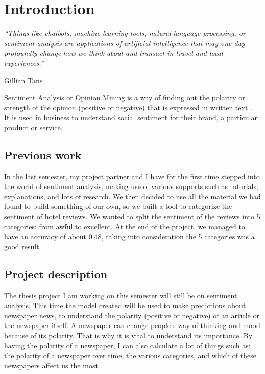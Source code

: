\section[Introduction]{Introduction}
\label{chap:introduction}
\epigraph{\centering \textit{“Things like chatbots, machine learning tools, natural language processing, or sentiment analysis are applications of artificial intelligence that may one day profoundly change how we think about and transact in travel and local experiences.”}}{Gillian Tans}

Sentiment Analysis or Opinion Mining is a way of finding out the polarity or strength of the opinion (positive or negative) that is expressed in written text \cite{samuels_news_2020}.\\
It is used in business to understand social sentiment for their brand, a particular product or service.

\subsection[Previous work]{Previous work}
\label{chap:previouswork}
In the last semester, my project partner and I have for the first time stepped into the world of sentiment analysis, making use of various supports such as tutorials, explanations, and lots of research.
We then decided to use all the material we had found to build something of our own, so we built a tool to categorize the sentiment of hotel reviews.
We wanted to split the sentiment of the reviews into 5 categories: from awful to excellent.
At the end of the project, we managed to have an \gls{accuracy} of about 0.48, taking into consideration the 5 categories was a good result.


\subsection[Project description]{Project description}
\label{chap:intropj_desc}
The thesis project I am working on this semester will still be on sentiment analysis. This time the model created will be used to make predictions about newspaper news, to understand the polarity (positive or negative) of an article or the newspaper itself.
A newspaper can change people's way of thinking and mood because of its polarity. That is why it is vital to understand its importance.
By having the polarity of a newspaper, I can also calculate a lot of things such as: the polarity of a newspaper over time, the various categories, and which of these newspapers affect us the most.

